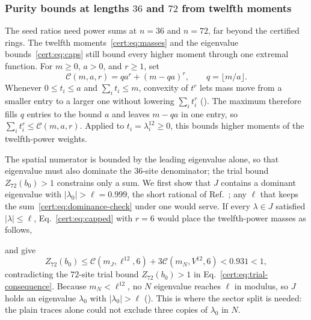 \subsubsection{Purity bounds at lengths $36$ and $72$ from twelfth moments}
\label{cert:sec:base-defects}

The seed ratios need power sums at $n=36$ and $n=72$, far beyond the
certified rings. The twelfth moments~\eqref{cert:eq:masses} and the
eigenvalue bounds~\eqref{cert:eq:caps} still bound every higher moment through one
extremal function. For $m\ge0$, $a>0$, and $r\ge1$,
set%
~
\begin{equation}
    \mathcal C(m,a,r)=qa^r+(m-qa)^r,\qquad
    q=\lfloor m/a\rfloor.
    \label{cert:eq:capped}
\end{equation}
Whenever $0\le t_i\le a$ and $\sum_i t_i\le m$, convexity of $t^r$ lets
mass move from a smaller entry to a larger one without lowering
$\sum_i t_i^r$ (\massmoves). The maximum therefore fills $q$ entries to
the bound $a$ and leaves $m-qa$ in one entry, so $\sum_i t_i^r\le\mathcal C(m,a,r)$.
Applied to $t_i=\lambda_i^{12}\ge0$, this bounds higher moments of the
twelfth-power weights.

The spatial numerator is bounded by the leading eigenvalue alone, so that
eigenvalue must also dominate the $36$-site denominator; the trial bound
$Z_{72}(b_0)>1$ constrains only a sum. We first show that $J$ contains a dominant eigenvalue with
$|\lambda_0|>\ell=0.999$, the short rational of
Ref.~\cite{OpenAI2026Periodic}; any $\ell$ that keeps the
sum~\eqref{cert:eq:dominance-check} under one would serve. If every $\lambda\in J$
satisfied $|\lambda|\le\ell$, Eq.~\eqref{cert:eq:capped} with $r=6$ would
place the twelfth-power masses as follows,
\begin{proofdiagram}
    \cappedmassfigure
\end{proofdiagram}
and give
\begin{equation}
    Z_{72}(b_0)
    \le\mathcal C(m_J,\ell^{12},6)
    +3\mathcal C(m_N,V^{12},6)
    <0.931<1,
    \label{cert:eq:dominance-check}
\end{equation}
contradicting the $72$-site trial bound $Z_{72}(b_0)>1$ in
Eq.~\eqref{cert:eq:trial-consequence}. Because $m_N<\ell^{12}$, no $N$
eigenvalue reaches $\ell$ in modulus, so $J$ holds an eigenvalue
$\lambda_0$ with $|\lambda_0|>\ell$ (\sectorspectrum). This is where the sector split
is needed: the plain traces alone could not exclude three copies of
$\lambda_0$ in $N$.


